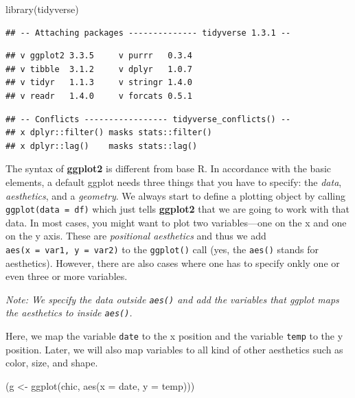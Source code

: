 \documentclass[
]{krantz}
\makeatletter
\newenvironment{Shaded}{\begin{snugshade}}{\end{snugshade}}
\newcommand{\AttributeTok}[1]{\textcolor[rgb]{0.61,0.61,0.61}{#1}}
\newcommand{\FunctionTok}[1]{\textcolor[rgb]{0,0,0}{#1}}
\newcommand{\NormalTok}[1]{#1}
\newcommand{\OtherTok}[1]{\textcolor[rgb]{0.37,0.37,0.37}{#1}}
\newenvironment{kframe}{%
\medskip{}
\setlength{\fboxsep}{.8em}
 \def\at@end@of@kframe{}%
 \ifinner\ifhmode%
  \def\at@end@of@kframe{\end{minipage}}%
  \begin{minipage}{\columnwidth}%
 \fi\fi%
 \def\FrameCommand##1{\hskip\@totalleftmargin \hskip-\fboxsep
 \colorbox{shadecolor}{##1}\hskip-\fboxsep
     \hskip-\linewidth \hskip-\@totalleftmargin \hskip\columnwidth}%
 \MakeFramed {\advance\hsize-\width
   \@totalleftmargin\z@ \linewidth\hsize
   \@setminipage}}%
 {\par\unskip\endMakeFramed%
 \at@end@of@kframe}
\renewenvironment{Shaded}{\begin{kframe}}{\end{kframe}}
\makeatother
\begin{document}
\begin{Shaded}
\begin{Highlighting}[]
\FunctionTok{library}\NormalTok{(tidyverse)}
\end{Highlighting}
\end{Shaded}

\begin{verbatim}
## -- Attaching packages -------------- tidyverse 1.3.1 --
\end{verbatim}

\begin{verbatim}
## v ggplot2 3.3.5     v purrr   0.3.4
## v tibble  3.1.2     v dplyr   1.0.7
## v tidyr   1.1.3     v stringr 1.4.0
## v readr   1.4.0     v forcats 0.5.1
\end{verbatim}

\begin{verbatim}
## -- Conflicts ----------------- tidyverse_conflicts() --
## x dplyr::filter() masks stats::filter()
## x dplyr::lag()    masks stats::lag()
\end{verbatim}

The syntax of \textbf{ggplot2} is different from base R. In accordance with the basic elements, a default ggplot needs three things that you have to specify: the \emph{data}, \emph{aesthetics}, and a \emph{geometry}. We always start to define a plotting object by calling \texttt{ggplot(data\ =\ df)} which just tells \textbf{ggplot2} that we are going to work with that data. In most cases, you might want to plot two variables---one on the x and one on the y axis. These are \emph{positional aesthetics} and thus we add \texttt{aes(x\ =\ var1,\ y\ =\ var2)} to the \texttt{ggplot()} call (yes, the \texttt{aes()} stands for aesthetics). However, there are also cases where one has to specify onkly one or even three or more variables.

\emph{Note: We specify the data outside \texttt{aes()} and add the variables that ggplot maps the aesthetics to inside \texttt{aes()}.}

Here, we map the variable \texttt{date} to the x position and the variable \texttt{temp} to the y position. Later, we will also map variables to all kind of other aesthetics such as color, size, and shape.

\begin{Shaded}
\begin{Highlighting}[]
\NormalTok{(g }\OtherTok{\textless{}{-}} \FunctionTok{ggplot}\NormalTok{(chic, }\FunctionTok{aes}\NormalTok{(}\AttributeTok{x =}\NormalTok{ date, }\AttributeTok{y =}\NormalTok{ temp)))}
\end{Highlighting}
\end{Shaded}
\end{document}
